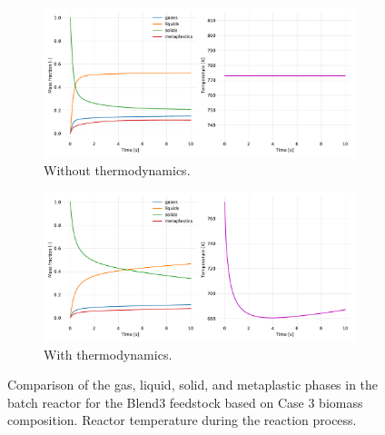 \begin{figure}[H]
    \begin{subfigure}{\textwidth}
        \centering
    \includegraphics[width=\textwidth]{figures/blend3-case3-phases-temp.pdf}
        \caption{Without thermodynamics.}
    \end{subfigure}
    \begin{subfigure}{\textwidth}
        \centering
    \includegraphics[width=\textwidth]{figures/blend3-case3-phases-temp-thermo.pdf}
        \caption{With thermodynamics.}
    \end{subfigure}
    \caption{Comparison of the gas, liquid, solid, and metaplastic phases in the batch reactor for the Blend3 feedstock based on Case 3 biomass composition. Reactor temperature during the reaction process.}
    \label{fig:blend3-case3-phases-temp}
\end{figure}

